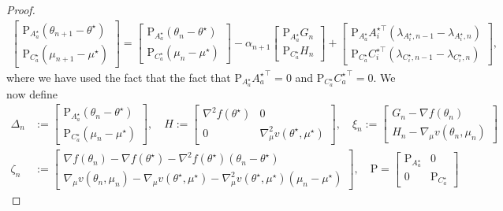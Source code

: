 \documentclass[11pt,a4paper]{article}
\theoremstyle{definition}
\begin{document}
\begin{proof}
\begin{align}
\label{eq:proof:asymp:norm:iter:1}
    \begin{bmatrix} \text{P}_{A^\star_a}(\theta_{n+1} - \theta^\star) \\ \text{P}_{C^\star_a}(\mu_{n+1}-\mu^\star) \end{bmatrix} = \begin{bmatrix} \text{P}_{A^\star_a}(\theta_{n} - \theta^\star) \\ \text{P}_{C^\star_a}(\mu_{n}-\mu^\star) \end{bmatrix} - \alpha_{n+1} \begin{bmatrix} \text{P}_{A^\star_a} G_n \\ \text{P}_{C^\star_a} H_n \end{bmatrix} + \begin{bmatrix} \text{P}_{A^\star_a} A_i^{\star\top} (\lambda_{A^\star_i,n-1} - \lambda_{A^\star_i,n}) \\ \text{P}_{C^\star_a} C_i^{\star\top} (\lambda_{C^\star_i,n-1} - \lambda_{C^\star_i,n}) \end{bmatrix},
\end{align}
where we have used the fact that the fact that $\text{P}_{A_a^\star} {A_a^\star}^\top = 0$ and $\text{P}_{C_a^\star} {C_a^\star}^\top = 0$. We now define
\begin{align*}
    \Delta_{n} &:= \begin{bmatrix} \text{P}_{A^\star_a}(\theta_{n} - \theta^\star) \\ \text{P}_{C^\star_a}(\mu_{n}-\mu^\star) \end{bmatrix}, 
    \quad
    H := \begin{bmatrix} \nabla^2 {f}(\theta^\star) & 0\\ 0 & \nabla_\mu^2 v(\theta^\star,\mu^\star)\end{bmatrix}, 
    \quad
    \xi_n := \begin{bmatrix}G_n - \nabla f(\theta_n) \\ H_n - \nabla_\mu v(\theta_n,\mu_n)\end{bmatrix}
     \\
    \zeta_n &:= \begin{bmatrix} \nabla f(\theta_n) - \nabla f(\theta^\star) - \nabla^2 f(\theta^\star)(\theta_n - \theta^\star) \\  \nabla_\mu v(\theta_n,\mu_n) - \nabla_\mu v(\theta^\star,\mu^\star) - \nabla_\mu^2 v(\theta^\star,\mu^\star)(\mu_n - \mu^\star) \end{bmatrix}, \quad
    \text{P} = \begin{bmatrix} \text{P}_{A^\star_a} & 0 \\ 0 & \text{P}_{C^\star_a} \end{bmatrix}

\end{align*}
\end{proof}
\end{document}
